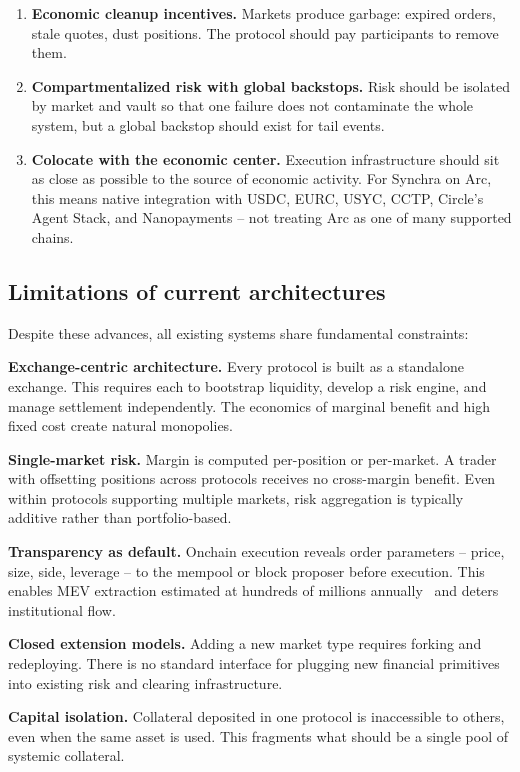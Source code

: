 \documentclass[11pt,a4paper]{article}
\begin{document}
\begin{enumerate}
  \item \textbf{Economic cleanup incentives.} Markets produce garbage: expired orders, stale quotes, dust positions. The protocol should pay participants to remove them.

  \item \textbf{Compartmentalized risk with global backstops.} Risk should be isolated by market and vault so that one failure does not contaminate the whole system, but a global backstop should exist for tail events.

  \item \textbf{Colocate with the economic center.} Execution infrastructure should sit as close as possible to the source of economic activity. For Synchra on Arc, this means native integration with USDC, EURC, USYC, CCTP, Circle's Agent Stack, and Nanopayments -- not treating Arc as one of many supported chains.
\end{enumerate}

\subsection{Limitations of current architectures}

Despite these advances, all existing systems share fundamental constraints:

\textbf{Exchange-centric architecture.} Every protocol is built as a standalone exchange. This requires each to bootstrap liquidity, develop a risk engine, and manage settlement independently. The economics of marginal benefit and high fixed cost create natural monopolies.

\textbf{Single-market risk.} Margin is computed per-position or per-market. A trader with offsetting positions across protocols receives no cross-margin benefit. Even within protocols supporting multiple markets, risk aggregation is typically additive rather than portfolio-based.

\textbf{Transparency as default.} Onchain execution reveals order parameters -- price, size, side, leverage -- to the mempool or block proposer before execution. This enables MEV extraction estimated at hundreds of millions annually~\cite{mev} and deters institutional flow.

\textbf{Closed extension models.} Adding a new market type requires forking and redeploying. There is no standard interface for plugging new financial primitives into existing risk and clearing infrastructure.

\textbf{Capital isolation.} Collateral deposited in one protocol is inaccessible to others, even when the same asset is used. This fragments what should be a single pool of systemic collateral.
\end{document}
